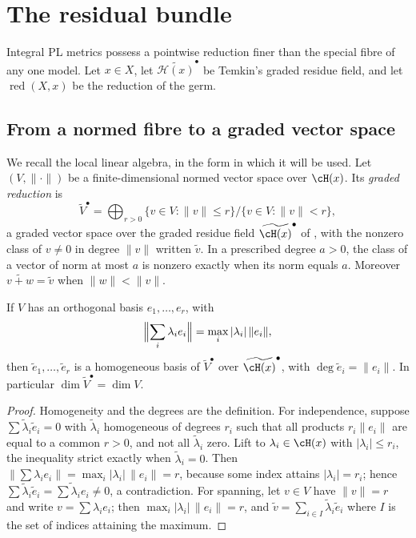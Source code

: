 \section{The residual bundle}
\label{sec:ch17-residual}

Integral PL metrics possess a pointwise reduction finer than the special
fibre of any one model.  Let $x\in X$, let
$\widetilde{\mathcal H(x)}^{\bullet}$ be Temkin's graded residue field,
and let $\operatorname{red}(X,x)$ be the reduction of the germ.

\subsection{From a normed fibre to a graded vector space}
\label{sec:ch17-residual-fibre}

We recall the local linear algebra, in the form in which it will be used.
Let $(V,\|\cdot\|)$ be a finite-dimensional normed vector space over
$\cH(x)$.  Its \emph{graded reduction} is
\[
 \widetilde V^{\bullet}
 =\bigoplus_{r>0}
   \{v\in V:\|v\|\le r\}\big/\{v\in V:\|v\|<r\},
\]
a graded vector space over the graded residue field
$\widetilde{\cH(x)}^{\bullet}$ of , with
the nonzero class of $v\ne0$ in degree $\|v\|$ written $\widetilde v$.
In a prescribed degree $a>0$, the class of a vector of norm at most $a$
is nonzero exactly when its norm equals $a$.  Moreover
$\widetilde{v+w}=\widetilde v$ when $\|w\|<\|v\|$.

\begin{lemma}
\label{lem:ch17-orthogonal-reduces}
If $V$ has an orthogonal basis $e_1,\dots,e_r$, with
\[
 \Bigl\|\sum_i\lambda_ie_i\Bigr\|
 =\max_i|\lambda_i|\,\|e_i\|,
\]
then
$\widetilde e_1,\dots,\widetilde e_r$ is a homogeneous basis of
$\widetilde V^{\bullet}$ over $\widetilde{\cH(x)}^{\bullet}$, with
$\deg\widetilde e_i=\|e_i\|$.  In particular
$\dim\widetilde V^{\bullet}=\dim V$.
\end{lemma}

\begin{proof}
Homogeneity and the degrees are the definition.  For independence, suppose
$\sum\widetilde\lambda_i\widetilde e_i=0$ with
$\widetilde\lambda_i$ homogeneous of degrees $r_i$ such that all
products $r_i\|e_i\|$ are equal to a common $r>0$, and not all
$\widetilde\lambda_i$ zero.  Lift to $\lambda_i\in\cH(x)$ with
$|\lambda_i|\le r_i$, the inequality strict exactly when
$\widetilde\lambda_i=0$.  Then
$\bigl\|\sum\lambda_ie_i\bigr\|=\max_i|\lambda_i|\,\|e_i\|=r$, because
some index attains $|\lambda_i|=r_i$; hence
$\sum\widetilde\lambda_i\widetilde e_i=\widetilde{\sum\lambda_ie_i}\ne0$,
a contradiction.  For spanning, let $v\in V$ have $\|v\|=r$ and write
$v=\sum\lambda_ie_i$; then $\max_i|\lambda_i|\,\|e_i\|=r$, and
$\widetilde v=\sum_{i\in I}\widetilde\lambda_i\widetilde e_i$ where $I$
is the set of indices attaining the maximum.
\end{proof}

